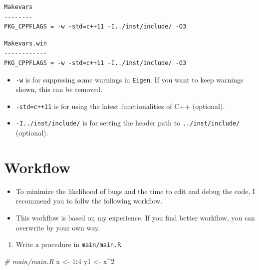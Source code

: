 \documentclass[]{book}
\newenvironment{Shaded}{\begin{snugshade}}{\end{snugshade}}
\newcommand{\DecValTok}[1]{\textcolor[rgb]{0.00,0.00,0.81}{#1}}
\newcommand{\StringTok}[1]{\textcolor[rgb]{0.31,0.60,0.02}{#1}}
\newcommand{\CommentTok}[1]{\textcolor[rgb]{0.56,0.35,0.01}{\textit{#1}}}
\newcommand{\OperatorTok}[1]{\textcolor[rgb]{0.81,0.36,0.00}{\textbf{#1}}}
\newcommand{\NormalTok}[1]{#1}
\providecommand{\tightlist}{%
  \setlength{\itemsep}{0pt}\setlength{\parskip}{0pt}}
\begin{document}
\begin{itemize}
\begin{verbatim}
Makevars
--------
PKG_CPPFLAGS = -w -std=c++11 -I../inst/include/ -O3
\end{verbatim}

\begin{verbatim}
Makevars.win
------------
PKG_CPPFLAGS = -w -std=c++11 -I../inst/include/ -O3
\end{verbatim}

  \begin{itemize}
  \tightlist
  \item
    \texttt{-w} is for supprssing some warnings in \texttt{Eigen}. If
    you want to keep warnings shown, this can be removed.
  \item
    \texttt{-std=c++11} is for using the latest functionalities of C++
    (optional).
  \item
    \texttt{-I../inst/include/} is for setting the header path to
    \texttt{../inst/include/} (optional).
  \end{itemize}
\end{itemize}

\section{Workflow}\label{workflow}

\begin{itemize}
\tightlist
\item
  To minimize the likelihood of bugs and the time to edit and debug the
  code, I recommend you to follw the following workflow.
\item
  This workflow is based on my experience. If you find better workflow,
  you can overwrite by your own way.
\end{itemize}

\begin{enumerate}
\def\labelenumi{\arabic{enumi}.}
\tightlist
\item
  Write a procedure in \texttt{main/main.R}.
\end{enumerate}

\begin{Shaded}
\begin{Highlighting}[]
\CommentTok{# main/main.R}
\NormalTok{x <-}\StringTok{ }\DecValTok{1}\OperatorTok{:}\DecValTok{4}
\NormalTok{y1 <-}\StringTok{ }\NormalTok{x}\OperatorTok{^}\DecValTok{2}
\end{Highlighting}
\end{Shaded}
\end{document}
